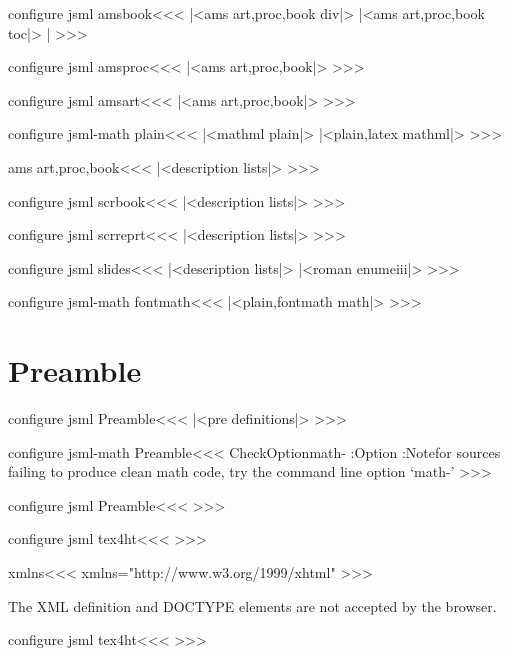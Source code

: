 \<configure jsml amsbook\><<<
|<ams art,proc,book div|>
|<ams art,proc,book toc|>  |%
>>>

\<configure jsml amsproc\><<<
|<ams art,proc,book|>
>>>



\<configure jsml amsart\><<<
|<ams art,proc,book|>
>>>

\<configure jsml-math plain\><<<
|<mathml plain|>
|<plain,latex mathml|>
>>>


\<ams art,proc,book\><<<
|<description lists|>
>>>


\<configure jsml scrbook\><<<
|<description lists|>
>>>


\<configure jsml scrreprt\><<<
|<description lists|>
>>>


\<configure jsml slides\><<<
|<description lists|>
|<roman enumeiii|>
>>>




\<configure jsml-math fontmath\><<<
|<plain,fontmath math|>
>>>






\section{Preamble}

\<configure jsml Preamble\><<<
|<pre definitions|>
>>>


\<configure jsml-math Preamble\><<<
\:CheckOption{math-}     \if:Option 
    \edef\Preamble{\Preamble,mathml-}
\else
   \Log:Note{for sources failing to produce
       clean math code, try the command line option `math-'}%
\fi
>>>






\<configure jsml Preamble\><<<
    {}          
>>>




\<configure jsml tex4ht\><<<
  {\IgnorePar{}}
  {\ifvmode\IgnorePar\fi{}}
>>>

\<xmlns\><<<
xmlns="http://www.w3.org/1999/xhtml"
>>>


The XML definition and DOCTYPE elements are not accepted by the
browser.


\<configure jsml tex4ht\><<<
    {}          
>>>

